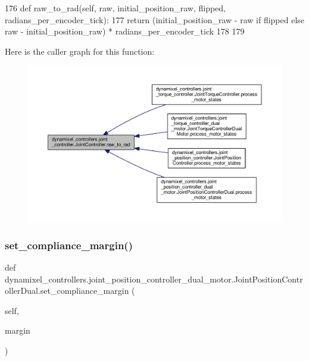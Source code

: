 \begin{DoxyCode}
176     \textcolor{keyword}{def }raw\_to\_rad(self, raw, initial\_position\_raw, flipped, radians\_per\_encoder\_tick):
177         \textcolor{keywordflow}{return} (initial\_position\_raw - raw \textcolor{keywordflow}{if} flipped \textcolor{keywordflow}{else} raw - initial\_position\_raw) * 
      radians\_per\_encoder\_tick
178 
179 \end{DoxyCode}
Here is the caller graph for this function\+:
\nopagebreak
\begin{figure}[H]
\begin{center}
\leavevmode
\includegraphics[width=350pt]{d3/dcd/classdynamixel__controllers_1_1joint__controller_1_1_joint_controller_a58a58e669c2918d00cc358f2b58d061c_icgraph}
\end{center}
\end{figure}
\mbox{\label{classdynamixel__controllers_1_1joint__position__controller__dual__motor_1_1_joint_position_controller_dual_a03c33eab77c79135ef8f40752206c292}} 
\subsubsection{\texorpdfstring{set\+\_\+compliance\+\_\+margin()}{set\_compliance\_margin()}}
{\footnotesize\ttfamily def dynamixel\+\_\+controllers.\+joint\+\_\+position\+\_\+controller\+\_\+dual\+\_\+motor.\+Joint\+Position\+Controller\+Dual.\+set\+\_\+compliance\+\_\+margin (\begin{DoxyParamCaption}\item[{}]{self,  }\item[{}]{margin }\end{DoxyParamCaption})}



